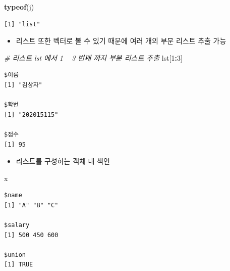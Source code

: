 \documentclass[
  11pt,
]{krantz}
\newenvironment{Shaded}{\begin{snugshade}}{\end{snugshade}}
\newcommand{\CommentTok}[1]{\textcolor[rgb]{0.37,0.37,0.37}{\textit{#1}}}
\newcommand{\DecValTok}[1]{\textcolor[rgb]{0.06,0.06,0.06}{#1}}
\newcommand{\KeywordTok}[1]{\textcolor[rgb]{0.27,0.27,0.27}{\textbf{#1}}}
\newcommand{\NormalTok}[1]{#1}
\newcommand{\OperatorTok}[1]{\textcolor[rgb]{0.43,0.43,0.43}{\textbf{#1}}}
\providecommand{\tightlist}{%
  \setlength{\itemsep}{0pt}\setlength{\parskip}{0pt}}
\begin{document}
\begin{Shaded}
\begin{Highlighting}[]
\KeywordTok{typeof}\NormalTok{(j)}
\end{Highlighting}
\end{Shaded}

\begin{verbatim}
[1] "list"
\end{verbatim}

\normalsize

\begin{itemize}
\tightlist
\item
  리스트 또한 벡터로 볼 수 있기 때문에 여러 개의 부분 리스트 추출 가능
\end{itemize}

\footnotesize

\begin{Shaded}
\begin{Highlighting}[]
\CommentTok{# 리스트 lst 에서 1 ~ 3 번째 까지 부분 리스트 추출}
\NormalTok{lst[}\DecValTok{1}\OperatorTok{:}\DecValTok{3}\NormalTok{]}
\end{Highlighting}
\end{Shaded}

\begin{verbatim}
$이름
[1] "김상자"

$학번
[1] "202015115"

$점수
[1] 95
\end{verbatim}

\normalsize

\begin{itemize}
\tightlist
\item
  리스트를 구성하는 객체 내 색인
\end{itemize}

\footnotesize

\begin{Shaded}
\begin{Highlighting}[]
\NormalTok{x}
\end{Highlighting}
\end{Shaded}

\begin{verbatim}
$name
[1] "A" "B" "C"

$salary
[1] 500 450 600

$union
[1] TRUE
\end{verbatim}

\begin{Shaded}
\end{Shaded}
\end{document}
